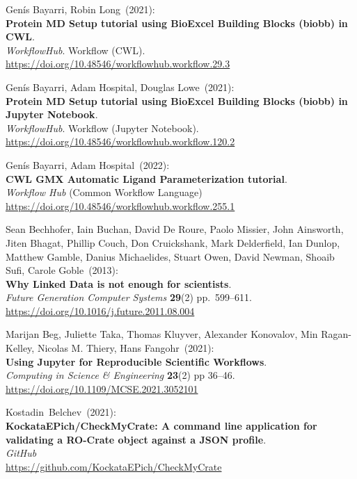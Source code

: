 \begin{thebibliography}{9}
Genís Bayarri, Robin Long~(2021): \\
\textbf{Protein MD Setup tutorial using BioExcel Building Blocks (biobb)
in CWL}.\\
\emph{WorkflowHub}. Workflow (CWL).\\
\url{https://doi.org/10.48546/workflowhub.workflow.29.3}

Genís Bayarri, Adam Hospital, Douglas Lowe~(2021): \\
\textbf{Protein MD Setup tutorial using BioExcel Building Blocks (biobb)
in Jupyter Notebook}.\\
\emph{WorkflowHub}. Workflow (Jupyter Notebook).\\
\url{https://doi.org/10.48546/workflowhub.workflow.120.2}

Genís Bayarri, Adam Hospital~(2022): \\
\textbf{CWL GMX Automatic Ligand Parameterization tutorial}.\\
\emph{Workflow Hub} (Common Workflow Language)\\
\url{https://doi.org/10.48546/workflowhub.workflow.255.1}

Sean Bechhofer, Iain Buchan, David De Roure, Paolo Missier,
John Ainsworth, Jiten Bhagat, Phillip Couch, Don Cruickshank, Mark
Delderfield, Ian Dunlop, Matthew Gamble, Danius Michaelides, Stuart
Owen, David Newman, Shoaib Sufi, Carole Goble~(2013): \\
\textbf{Why Linked Data is not enough for scientists}.\\
\emph{Future Generation Computer Systems} \textbf{29}(2)
pp.~599--611.\\
\url{https://doi.org/10.1016/j.future.2011.08.004}

Marijan Beg, Juliette Taka, Thomas Kluyver, Alexander
Konovalov, Min Ragan-Kelley, Nicolas M. Thiery, Hans Fangohr~(2021): \\
\textbf{Using Jupyter for Reproducible Scientific Workflows}.\\
\emph{Computing in Science \& Engineering} \textbf{23}(2) pp 36--46.\\
\url{https://doi.org/10.1109/MCSE.2021.3052101}

Kostadin~Belchev~(2021): \\
\textbf{KockataEPich/CheckMyCrate: A command line application for
validating a RO-Crate object against a JSON profile}.\\
\emph{GitHub}\\
\url{https://github.com/KockataEPich/CheckMyCrate}


\end{thebibliography}
